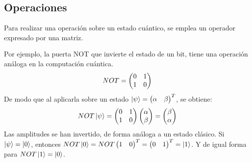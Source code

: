 \subsection{Operaciones}



Para realizar una operación sobre un estado cuántico, se emplea un operador 
expresado por una matriz.

Por ejemplo, la puerta NOT que invierte el estado de un bit, tiene una operación 
análoga en la computación cuántica.
%
$$ NOT = \begin{pmatrix} 0 & 1 \\ 1 & 0 \end{pmatrix} $$
%
De modo que al aplicarla sobre un estado $\ket{\psi} = \begin{pmatrix} \alpha & \beta \end{pmatrix}^T$, 
se obtiene:
%
$$ NOT \ket{\psi} = \begin{pmatrix} 0 & 1 \\ 1 & 0 \end{pmatrix} \begin{pmatrix} \alpha \\ \beta \end{pmatrix} = \begin{pmatrix} \beta \\ 
\alpha \end{pmatrix} $$
%
Las amplitudes se han invertido, de forma análoga a un estado clásico. Si 
$\ket{\psi} = \ket{0}$, entonces $NOT\ket{0} = NOT \begin{pmatrix} 1 & 0 \end{pmatrix}^T = \begin{pmatrix} 0 & 
1 \end{pmatrix}^T = \ket{1}$. Y de igual forma para $NOT \ket{1} = \ket{0}$.
